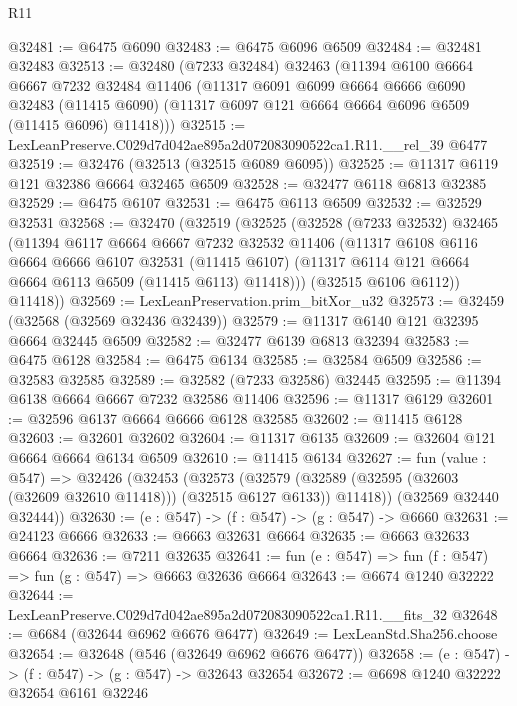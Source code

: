 \begin{lexlean}{R11}
\begin{coremodule}
@32481 := @6475 @6090
@32483 := @6475 @6096 @6509
@32484 := @32481 @32483
@32513 := @32480
    (@7233 @32484)
    @32463
    (@11394
      @6100
      @6664
      @6667
      @7232
      @32484
      @11406
      (@11317
        @6091
        @6099
        @6664
        @6666
        @6090
        @32483
        (@11415 @6090)
        (@11317 @6097 @121 @6664 @6664 @6096 @6509 (@11415 @6096) @11418)))
@32515 := LexLeanPreserve.C029d7d042ae895a2d072083090522ca1.R11.__rel_39 @6477
@32519 := @32476 (@32513 (@32515 @6089 @6095))
@32525 := @11317 @6119 @121 @32386 @6664 @32465 @6509
@32528 := @32477 @6118 @6813 @32385
@32529 := @6475 @6107
@32531 := @6475 @6113 @6509
@32532 := @32529 @32531
@32568 := @32470
    (@32519
      (@32525
        (@32528
          (@7233 @32532)
          @32465
          (@11394
            @6117
            @6664
            @6667
            @7232
            @32532
            @11406
            (@11317
              @6108
              @6116
              @6664
              @6666
              @6107
              @32531
              (@11415 @6107)
              (@11317 @6114 @121 @6664 @6664 @6113 @6509 (@11415 @6113) @11418)))
          (@32515 @6106 @6112))
        @11418))
@32569 := LexLeanPreservation.prim_bitXor_u32
@32573 := @32459 (@32568 (@32569 @32436 @32439))
@32579 := @11317 @6140 @121 @32395 @6664 @32445 @6509
@32582 := @32477 @6139 @6813 @32394
@32583 := @6475 @6128
@32584 := @6475 @6134
@32585 := @32584 @6509
@32586 := @32583 @32585
@32589 := @32582 (@7233 @32586) @32445
@32595 := @11394 @6138 @6664 @6667 @7232 @32586 @11406
@32596 := @11317 @6129
@32601 := @32596 @6137 @6664 @6666 @6128 @32585
@32602 := @11415 @6128
@32603 := @32601 @32602
@32604 := @11317 @6135
@32609 := @32604 @121 @6664 @6664 @6134 @6509
@32610 := @11415 @6134
@32627 := fun (value : @547) =>
  @32426
    (@32453
      (@32573
        (@32579 (@32589 (@32595 (@32603 (@32609 @32610 @11418))) (@32515 @6127 @6133)) @11418))
      (@32569 @32440 @32444))
@32630 := (e : @547) -> (f : @547) -> (g : @547) -> @6660
@32631 := @24123 @6666
@32633 := @6663 @32631 @6664
@32635 := @6663 @32633 @6664
@32636 := @7211 @32635
@32641 := fun (e : @547) => fun (f : @547) => fun (g : @547) => @6663 @32636 @6664
@32643 := @6674 @1240 @32222
@32644 := LexLeanPreserve.C029d7d042ae895a2d072083090522ca1.R11.__fits_32
@32648 := @6684 (@32644 @6962 @6676 @6477)
@32649 := LexLeanStd.Sha256.choose
@32654 := @32648 (@546 (@32649 @6962 @6676 @6477))
@32658 := (e : @547) -> (f : @547) -> (g : @547) -> @32643 @32654
@32672 := @6698
    @1240
    @32222
    @32654
    @6161
    @32246

\end{coremodule}
\end{lexlean}
